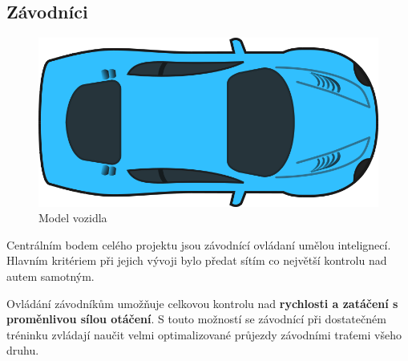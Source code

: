\documentclass[a4paper,12pt]{article}
\begin{document}
        \subsection{Závodníci}
            \hfill
            \vspace{-2em}
            \begin{figure}
                \centering
                \includegraphics[width=0.7\linewidth]{../data/carClipArt.jpg}
                \caption{Model vozidla \cite{c:carmodel}} 
                \label{fig:carpic}
            \end{figure}

            Centrálním bodem celého projektu jsou závodnící ovládaní umělou intelignecí.
            Hlavním kritériem při jejich vývoji bylo předat sítím co největší kontrolu nad 
            autem samotným. 

            \vspace{2em}
            \begin{figure}[H]
            \centering
            \begin{minipage}[t]{.5\textwidth}
                \centering
            \end{minipage}%
            \begin{minipage}[t]{.5\textwidth}
                \centering
            \end{minipage}
            \label{fig:controlls}
            \end{figure}

            Ovládání závodníkům umožňuje celkovou kontrolu nad \textbf{rychlosti a zatáčení s proměnlivou
            sílou otáčení}. S touto možností se závodnící při dostatečném tréninku zvládají naučit
            velmi optimalizované průjezdy závodními traťemi všeho druhu.
\end{document}

